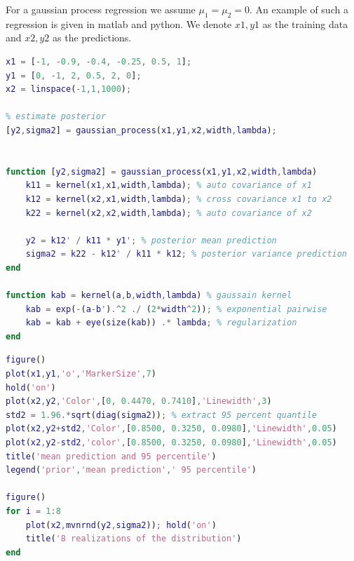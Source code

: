 \documentclass{article}
\begin{document}
\newpage

For a gaussian process regression we assume $\mu_1 = \mu_2 = 0$. An example of such a regression is given in matlab and python. We denote $x1,y1$ as the training data and $x2,y2$ as the predictions.


\begin{lstlisting}[language=Matlab, caption=matlab implementation of a gaussian process]
% specify distribution
x1 = [-1, -0.9, -0.4, -0.25, 0.5, 1];
y1 = [0, -1, 2, 0.5, 2, 0];
x2 = linspace(-1,1,1000);

% estimate posterior
[y2,sigma2] = gaussian_process(x1,y1,x2,width,lambda);


function [y2,sigma2] = gaussian_process(x1,y1,x2,width,lambda)
    k11 = kernel(x1,x1,width,lambda); % auto covariance of x1
    k12 = kernel(x2,x1,width,lambda); % cross covariance x1 to x2
    k22 = kernel(x2,x2,width,lambda); % auto covariance of x2
    
    y2 = k12' / k11 * y1'; % posterior mean prediction
    sigma2 = k22 - k12' / k11 * k12; % posterior variance prediction
end

function kab = kernel(a,b,width,lambda) % gaussain kernel
    kab = exp(-(a-b').^2 ./ (2*width^2)); % exponential pairwise
    kab = kab + eye(size(kab)) .* lambda; % regularization
end
\end{lstlisting}

\begin{lstlisting}[language=Matlab, caption=code to create the plots in fig. 1 and 2]
figure()
plot(x1,y1,'o','MarkerSize',7)
hold('on')
plot(x2,y2,'Color',[0, 0.4470, 0.7410],'Linewidth',3)
std2 = 1.96.*sqrt(diag(sigma2)); % extract 95 percent quantile
plot(x2,y2+std2,'Color',[0.8500, 0.3250, 0.0980],'Linewidth',0.05)
plot(x2,y2-std2,'color',[0.8500, 0.3250, 0.0980],'Linewidth',0.05)
title('mean prediction and 95 percentile')
legend('prior','mean prediction',' 95 percentile')

figure()
for i = 1:8
    plot(x2,mvnrnd(y2,sigma2)); hold('on')
    title('8 realizations of the distribution')
end
\end{lstlisting}
\end{document}
